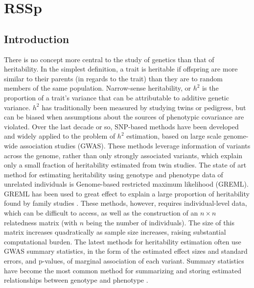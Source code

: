 \chapter{RSSp}



\section{Introduction}\label{sec:org3c6cf58}


There is no concept more central to the study of genetics than that of heritability. In the simplest definition, a trait is heritable if offspring are more similar to their parents (in regards to the trait) than they are to random members of the same population. Narrow-sense heritability, or $h^2$ is the proportion of a trait's variance that can be attributable to additive genetic variance. 
$h^2$ has traditionally been measured by studying twins or pedigress, but can be biased when assumptions about the sources of phenotypic covariance are violated\cite{keller2005quantifying}.
Over the last decade or so, SNP-based methods have been developed\cite{gcta} and widely applied to the problem of $h^2$ estimation, based on large scale genome-wide association studies (GWAS). 
These methods leverage information of variants across the genome, rather than only strongly associated variants, which explain only a small fraction of heritability estimated from twin studies.  
The state of art method for estimating heritability using genotype and phenotype data of unrelated individuals is Genome-based restricted maximum likelihood (GREML)\cite{GCTA}. GREML has been used to great effect to explain a large proportion of heritability found by family studies \cite{GCTA}. These methods, however, requires individual-level data, which can be difficult to access, as well as the construction of an $n \times n$ relatedness matrix (with $n$ being the number of individuals).  The size of this matrix increases quadratically as sample size increases, raising substantial computational burden.
The latest methods for heritability estimation often use GWAS summary statistics, in the form of the estimated effect sizes and standard errors, and p-values, of marginal association of each variant. Summary statistics have become the most common method for summarizing and storing estimated relationships between genotype and phenotype \cite{Lyon_2020}.
